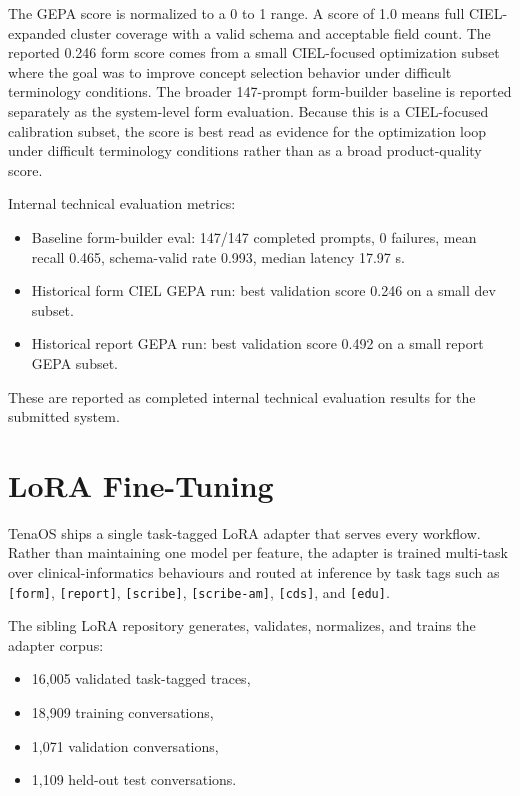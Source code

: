 \documentclass[11pt]{article}
\begin{document}
The GEPA score is normalized to a 0 to 1 range. A score of 1.0 means full CIEL-expanded cluster coverage with a valid schema and acceptable field count. The reported 0.246 form score comes from a small CIEL-focused optimization subset where the goal was to improve concept selection behavior under difficult terminology conditions. The broader 147-prompt form-builder baseline is reported separately as the system-level form evaluation. Because this is a CIEL-focused calibration subset, the score is best read as evidence for the optimization loop under difficult terminology conditions rather than as a broad product-quality score.

Internal technical evaluation metrics:

\begin{itemize}
  \item Baseline form-builder eval: 147/147 completed prompts, 0 failures, mean recall 0.465, schema-valid rate 0.993, median latency 17.97 s.
  \item Historical form CIEL GEPA run: best validation score 0.246 on a small dev subset.
  \item Historical report GEPA run: best validation score 0.492 on a small report GEPA subset.
\end{itemize}

These are reported as completed internal technical evaluation results for the submitted system.

\section{LoRA Fine-Tuning}

TenaOS ships a single task-tagged LoRA adapter that serves every workflow. Rather than maintaining one model per feature, the adapter is trained multi-task over clinical-informatics behaviours and routed at inference by task tags such as \texttt{[form]}, \texttt{[report]}, \texttt{[scribe]}, \texttt{[scribe-am]}, \texttt{[cds]}, and \texttt{[edu]}.

The sibling LoRA repository generates, validates, normalizes, and trains the adapter corpus:

\begin{itemize}
  \item 16,005 validated task-tagged traces,
  \item 18,909 training conversations,
  \item 1,071 validation conversations,
  \item 1,109 held-out test conversations.
\end{itemize}
\end{document}
